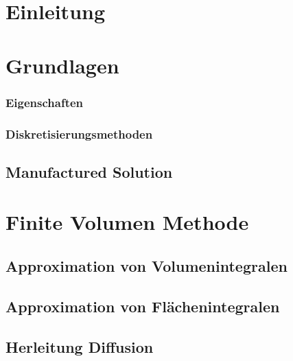 \documentclass[bigchapter,twoside,report,11pt,type=bsc,colorback,accentcolor=tud2c]{tudthesis}
\begin{document}

  \tableofcontents

  \chapter{Einleitung}
  

\chapter{Grundlagen}

  
  
  \subsection{Eigenschaften}
  \subsection{Diskretisierungsmethoden}
  
  \section{Manufactured Solution}

  \chapter{Finite Volumen Methode}
  \section{Approximation von Volumenintegralen}
  \section{Approximation von Flächenintegralen}
  \section{Herleitung Diffusion}
\end{document}
